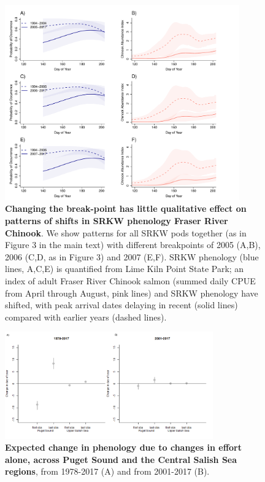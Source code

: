 \documentclass{article}
\begin{document}
\newpage
\begin{figure}[p]
\includegraphics[width=0.9\textwidth]{../analyses/orcaphen/figures/orcachinphenoverlapSRallbrkyears.pdf}
\caption{\textbf{Changing the break-point has little qualitative effect on patterns of shifts in SRKW phenology Fraser River Chinook}. We show patterns for all SRKW pods together (as in Figure 3 in the main text) with different breakpoints of 2005 (A,B), 2006 (C,D, as in Figure 3) and 2007 (E,F). SRKW phenology (blue lines, A,C,E) is quantified from Lime Kiln Point State Park; an index of adult Fraser River Chinook salmon (summed daily CPUE from April through August, pink lines) and SRKW phenology have shifted, with peak arrival dates delaying in recent (solid lines) compared with earlier years (dashed lines).}
\label{fig:brkpt}
\end{figure}


\begin{figure}[p]
\includegraphics[width=0.8\textwidth]{../analyses/orcaphen/figures/simeffortonly2panels.png} 
\caption{\textbf{Expected change in phenology due to changes in effort alone, across Puget Sound and the Central Salish Sea regions}, from 1978-2017 (A) and from 2001-2017 (B). }
\label{fig:simeffort}
\end{figure}
\end{document}
